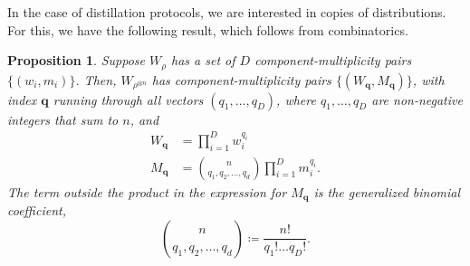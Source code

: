\documentclass[
twocolumn,
superscriptaddress
]{revtex4-1}
\newtheorem{proposition}[theorem]{Proposition}
\def\q{\boldsymbol{q}}
\def\q{\boldsymbol{q}}
\begin{document}
In the case of distillation protocols, we are interested in copies of distributions. 
For this, we have the following result, which follows from combinatorics.
\begin{proposition}\label{ncopycomponents}
	Suppose $W_\rho$ has a set of $D$ component-multiplicity pairs $\{(w_i, m_i)\}$. Then, $W_{\rho^{\otimes n}}$ has component-multiplicity pairs $\{(W_{\q}, M_{\q})\}$, with index $\q$ running through all vectors $(q_1, \dots, q_D)$, where $q_1, \dots, q_D$ are non-negative integers that sum to $n$, and
\begin{align}
	W_{\q} &= \prod_{i=1}^D w_i^{q_i} \label{eq:W}\\
	M_{\q} &= \binom{n}{q_1,q_2, \dots, q_d} \prod_{i=1}^D m_i^{q_i}. \label{eq:M}
\end{align}
The term outside the product in the expression for $M_{\q}$ is the generalized binomial coefficient,
\begin{equation}
	\binom{n}{q_1,q_2, \dots, q_d} \coloneqq \frac{n!}{q_1!\dots q_D!}.
\end{equation}
\end{proposition}
\end{document}
